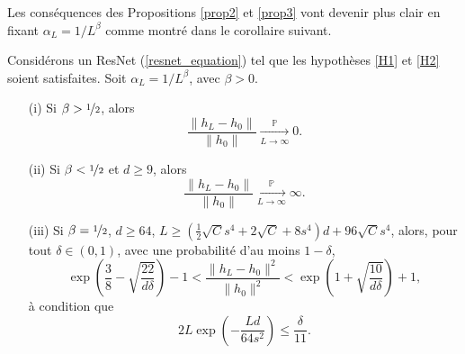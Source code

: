 Les conséquences des Propositions \ref{prop2} et \ref{prop3} vont devenir plus clair en fixant $ \alpha _L = 1/L ^\beta $ comme montré dans le corollaire suivant.
\begin{cor}\label{cor4}
    Considérons un ResNet (\ref{resnet_equation}) tel que les hypothèses \ref{H1} et \ref{H2} soient satisfaites. Soit $ \alpha_L = 1/L^\beta $, avec $ \beta > 0 $.
    \begin{itemize}
        \item[(i)] Si $ \beta > \nicefrac{1}{2} $, alors
        \[
            \frac{\|h_L - h_0\|}{\|h_0\|} \xrightarrow[L \to \infty]{\mathbb{P}} 0.
        \]
        \item[(ii)] Si $ \beta < \nicefrac{1}{2}$ et $d \geqslant 9 $, alors
        \[
            \frac{\|h_L - h_0\|}{\|h_0\|} \xrightarrow[L \to \infty]{\mathbb{P}} \infty.
        \]
        \item[(iii)] Si $ \beta = \nicefrac{1}{2} $, $ d \geqslant 64$, $L \geqslant (\frac{1}{2}\sqrt{C}s^4 + 2\sqrt{C} + 8s^4)d + 96\sqrt{C} s^4 $, alors, pour tout $ \delta \in (0, 1) $, avec une probabilité d'au moins $ 1 - \delta $,
        \[
            \exp\left(\frac{3}{8} - \sqrt{\frac{22}{d\delta}}\right) - 1 < \frac{\|h_L - h_0\|^2}{\|h_0\|^2} < \exp\left(1 + \sqrt{\frac{10}{d\delta}}\right) + 1,
        \]
        à condition que
        \[
            2L \exp\left(-\frac{Ld}{64s^2}\right) \leqslant \frac{\delta}{11}.
        \]
    \end{itemize}
\end{cor}
